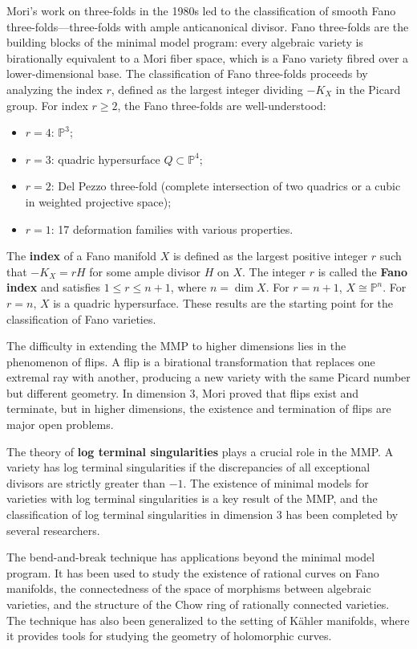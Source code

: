 Mori's work on three-folds in the 1980s led to the classification of smooth
Fano three-folds---three-folds with ample anticanonical divisor. Fano three-folds
are the building blocks of the minimal model program: every algebraic variety is
birationally equivalent to a Mori fiber space, which is a Fano variety fibred
over a lower-dimensional base. The classification of Fano three-folds proceeds
by analyzing the index $r$, defined as the largest integer dividing $-K_X$ in
the Picard group. For index $r \geq 2$, the Fano three-folds are
well-understood:
\begin{itemize}
    \item $r = 4$: $\mathbb{P}^3$;
    \item $r = 3$: quadric hypersurface $Q \subset \mathbb{P}^4$;
    \item $r = 2$: Del Pezzo three-fold (complete intersection of two quadrics
    or a cubic in weighted projective space);
    \item $r = 1$: 17 deformation families with various properties.
\end{itemize}

The \textbf{index} of a Fano manifold $X$ is defined as the largest positive
integer $r$ such that $-K_X = rH$ for some ample divisor $H$ on $X$. The
integer $r$ is called the \textbf{Fano index} and satisfies $1 \leq r \leq
n+1$, where $n = \dim X$. For $r = n+1$, $X \cong \mathbb{P}^n$. For $r = n$,
$X$ is a quadric hypersurface. These results are the starting point for the
classification of Fano varieties.

The difficulty in extending the MMP to higher dimensions lies in the phenomenon
of flips. A flip is a birational transformation that replaces one extremal ray
with another, producing a new variety with the same Picard number but different
geometry. In dimension 3, Mori proved that flips exist and terminate, but in
higher dimensions, the existence and termination of flips are major open
problems.

The theory of \textbf{log terminal singularities} plays a crucial role in the MMP.
A variety has log terminal singularities if the discrepancies of all exceptional
divisors are strictly greater than $-1$. The existence of minimal models for
varieties with log terminal singularities is a key result of the MMP, and the
classification of log terminal singularities in dimension 3 has been completed
by several researchers.

The bend-and-break technique has applications beyond the minimal model program.
It has been used to study the existence of rational curves on Fano manifolds,
the connectedness of the space of morphisms between algebraic varieties, and the
structure of the Chow ring of rationally connected varieties. The technique has
also been generalized to the setting of K\"ahler manifolds, where it provides
tools for studying the geometry of holomorphic curves.

